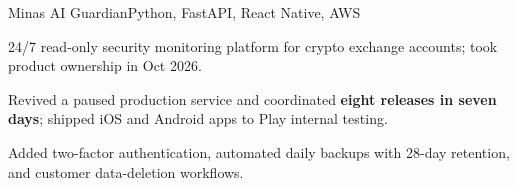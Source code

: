 \begin{cvproject}{Minas AI Guardian}{Python, FastAPI, React Native, AWS}
  \item 24/7 read-only security monitoring platform for crypto exchange accounts; took product ownership in Oct 2026.
  \item Revived a paused production service and coordinated \textbf{eight releases in seven days}; shipped iOS and Android apps to Play internal testing.
  \item Added two-factor authentication, automated daily backups with 28-day retention, and customer data-deletion workflows.
\end{cvproject}
